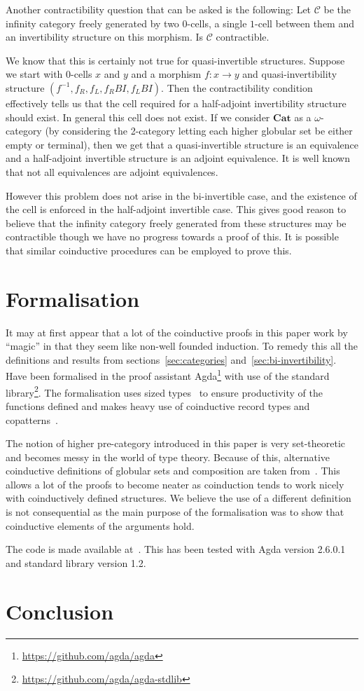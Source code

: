 \documentclass{article}
\theoremstyle{definition}
\theoremstyle{remark}
\newcommand{\inv}[1]{#1^{-1}}
\begin{document}
Another contractibility question that can be asked is the following: Let \(\mathcal{C}\) be the infinity category freely generated by two \(0\)-cells, a single \(1\)-cell between them and an invertibility structure on this morphism. Is \(\mathcal{C}\) contractible.

We know that this is certainly not true for quasi-invertible structures. Suppose we start with \(0\)-cells \(x\) and \(y\) and a morphism \(f : x \to y\) and quasi-invertibility structure \((\inv f, f_R, f_L, f_R{}BI, f_L{}BI)\). Then the contractibility condition effectively tells us that the cell required for a half-adjoint invertibility structure should exist. In general this cell does not exist. If we consider \(\mathbf{Cat}\) as a \(\omega\)-category (by considering the 2-category letting each higher globular set be either empty or terminal), then we get that a quasi-invertible structure is an equivalence and a half-adjoint invertible structure is an adjoint equivalence. It is well known that not all equivalences are adjoint equivalences.

However this problem does not arise in the bi-invertible case, and the existence of the cell is enforced in the half-adjoint invertible case. This gives good reason to believe that the infinity category freely generated from these structures may be contractible though we have no progress towards a proof of this. It is possible that similar coinductive procedures can be employed to prove this.

\section{Formalisation}\label{sec:formalisation}

It may at first appear that a lot of the coinductive proofs in this paper work by ``magic'' in that they seem like non-well founded induction. To remedy this all the definitions and results from  sections~\ref{sec:categories} and~\ref{sec:bi-invertibility}. Have been formalised in the proof assistant Agda\footnote{\url{https://github.com/agda/agda}} with use of the standard library\footnote{\url{https://github.com/agda/agda-stdlib}}. The formalisation uses sized types~\cite{Abel_2010} to ensure productivity of the functions defined and makes heavy use of coinductive record types and copatterns~\cite{10.1145/2480359.2429075}.

The notion of higher pre-category introduced in this paper is very set-theoretic and becomes messy in the world of type theory. Because of this, alternative coinductive definitions of globular sets and composition are taken from~\cite{hirschowitz_et_al:LIPIcs:2015:5166}. This allows a lot of the proofs to become neater as coinduction tends to work nicely with coinductively defined structures. We believe the use of a different definition is not consequential as the main purpose of the formalisation was to show that coinductive elements of the arguments hold.

The code is made available at~\cite{rice_agda}. This has been tested with Agda version 2.6.0.1 and standard library version 1.2.

\section{Conclusion}\label{sec:conclusion}


\printbibliography{}
\end{document}
